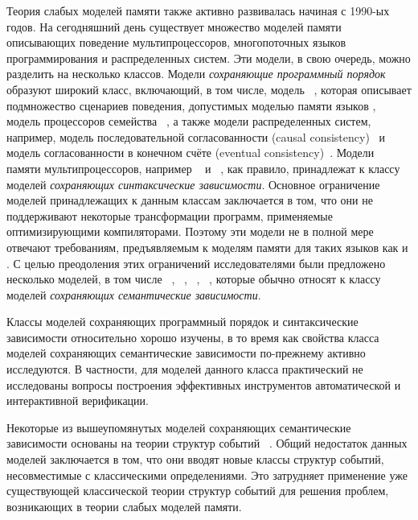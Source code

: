 Теория слабых моделей памяти также активно развивалась начиная с 1990-ых годов. 
На сегодняшний день существует множество моделей памяти 
описывающих поведение мультипроцессоров, 
многопоточных языков программирования и распределенных систем. 
Эти модели, в свою очередь, можно разделить на несколько классов. 
Модели \emph{сохраняющие программный порядок} образуют широкий класс, 
включающий, в том числе, модель \RCMM~\autocite{Lahav-al:PLDI17},
которая описывает подмножество сценариев поведения, допустимых моделью памяти языков \CPP,
модель \TSO процессоров семейства \Intel~\autocite{Sewell-al:CACM10},
а также модели распределенных систем, 
например, модель последовательной согласованности (causal consistency)~\autocite{Lahav-Boker:PLDI2020}
и модель согласованности в конечном счёте (eventual consistency)~\autocite{Jagadeesan-al:ESOP2018}.
Модели памяти мультипроцессоров, например ~\autocite{Pulte-al:POPL18} 
и \POWER~\autocite{Sarkar-al:PLDI11}, 
как правило, принадлежат к классу моделей \emph{сохраняющих синтаксические зависимости}. 
Основное ограничение моделей принадлежащих к данным классам заключается в том, 
что они не поддерживают некоторые трансформации программ, 
применяемые оптимизирующими компиляторами. 
Поэтому эти модели не в полной мере отвечают требованиям, 
предъявляемым к моделям памяти для таких языков как \CPP и \Java. 
С целью преодоления этих ограничений исследователями 
были предложено несколько моделей, в том числе 
\Prm~\autocite{Kang-al:POPL17}, \Wkm~\autocite{Chakraborty-Vafeiadis:POPL19}, 
\MRD~\autocite{Paviotti-al:ESOP20}, \PwP~\autocite{Jagadeesan-al:OOPSLA2020},
которые обычно относят к классу моделей \emph{сохраняющих семантические зависимости}.

Классы моделей сохраняющих программный порядок и синтаксические зависимости 
относительно хорошо изучены, в то время как свойства класса моделей 
сохраняющих семантические зависимости по-прежнему активно исследуются.
В частности, для моделей данного класса практический не исследованы
вопросы построения эффективных инструментов автоматической и интерактивной верификации. 

Некоторые из вышеупомянутых моделей сохраняющих семантические зависимости
основаны на теории структур событий%
~\autocite{Jeffrey-Riely:LICS16,PichonPharabod-Sewell:POPL16,
Chakraborty-Vafeiadis:POPL19,Paviotti-al:ESOP20}.
Общий недостаток данных моделей заключается в том,
что они вводят новые классы структур событий, 
несовместимые с классическими определениями.
Это затрудняет применение уже существующей классической теории структур событий
для решения проблем, возникающих в теории слабых моделей памяти. 

